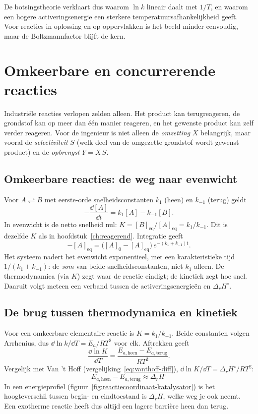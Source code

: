 De botsingstheorie verklaart dus waarom $\ln k$ lineair daalt met $1/T$, en waarom een hogere activeringsenergie een sterkere temperatuursafhankelijkheid geeft. Voor reacties in oplossing en op oppervlakken is het beeld minder eenvoudig, maar de Boltzmannfactor blijft de kern.

\section{Omkeerbare en concurrerende reacties}
\label{sec:meervoudige-reacties}

Industri\"ele reacties verlopen zelden alleen. Het product kan terugreageren, de grondstof kan op meer dan \'e\'en manier reageren, en het gewenste product kan zelf verder reageren. Voor de ingenieur is niet alleen de \emph{omzetting} $X$ belangrijk, maar vooral de \emph{selectiviteit} $S$ (welk deel van de omgezette grondstof wordt gewenst product) en de \emph{opbrengst} $Y = X\,S$.

\subsection{Omkeerbare reacties: de weg naar evenwicht}
\label{sec:omkeerbare-reacties}

Voor $A \rightleftharpoons B$ met eerste-orde snelheidsconstanten $k_1$ (heen) en $k_{-1}$ (terug) geldt
\[
-\frac{\dd{[A]}}{\dd{t}} = k_1[A] - k_{-1}[B].
\]
In evenwicht is de netto snelheid nul: $K = [B]_\mathrm{eq}/[A]_\mathrm{eq} = k_1/k_{-1}$. Dit is dezelfde $K$ als in hoofdstuk~\ref{ch:reagerend}. Integratie geeft
\begin{equation}
[A] - [A]_\mathrm{eq} = \bigl([A]_0 - [A]_\mathrm{eq}\bigr)\,e^{-(k_1+k_{-1})t}.
\label{eq:relaxatie}
\end{equation}
Het systeem nadert het evenwicht exponentieel, met een karakteristieke tijd $1/(k_1+k_{-1})$: de \emph{som} van beide snelheidsconstanten, niet $k_1$ alleen. De thermodynamica (via $K$) zegt waar de reactie eindigt; de kinetiek zegt hoe snel. Daaruit volgt meteen een verband tussen de activeringsenergie\"en en $\Delta_rH^\circ$.

\subsection{De brug tussen thermodynamica en kinetiek}
\label{sec:brug-thermo-kinetiek}

Voor een omkeerbare elementaire reactie is $K = k_1/k_{-1}$. Beide constanten volgen Arrhenius, dus $\dd\ln k/\dd T = E_a/RT^2$ voor elk. Aftrekken geeft
\[
\frac{\dd{\ln K}}{\dd{T}} = \frac{E_{a,\text{heen}} - E_{a,\text{terug}}}{RT^2}.
\]
Vergelijk met Van 't Hoff (vergelijking~\eqref{eq:vanthoff-diff}), $\dd\ln K/\dd T = \Delta_rH^\circ/RT^2$:
\begin{equation}
\boxed{\;E_{a,\text{heen}} - E_{a,\text{terug}} \approx \Delta_r H^\circ\;}
\label{eq:Ea-verschil-drH}
\end{equation}
In een energieprofiel (figuur~\ref{fig:reactiecoordinaat-katalysator}) is het hoogteverschil tussen begin- en eindtoestand is $\Delta_rH$, welke weg je ook neemt. Een exotherme reactie heeft dus altijd een lagere barri\`ere heen dan terug.

